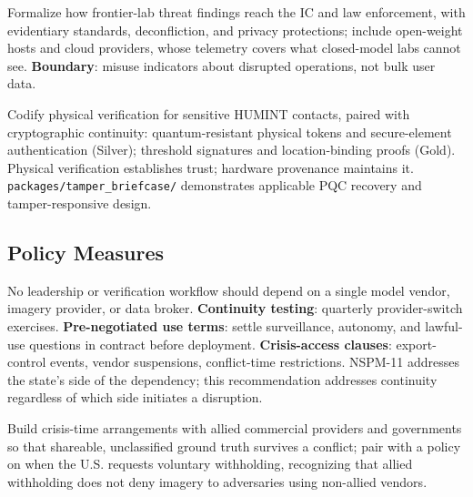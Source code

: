 \documentclass[11pt,letterpaper]{article}
\begin{document}
\begin{recbox}
Formalize how frontier-lab threat findings reach the IC and law enforcement, with evidentiary standards, deconfliction, and privacy protections; include open-weight hosts and cloud providers, whose telemetry covers what closed-model labs cannot see. \textbf{Boundary}: misuse indicators about disrupted operations, not bulk user data.
\end{recbox}

\begin{recbox}
Codify physical verification for sensitive HUMINT contacts, paired with cryptographic continuity: quantum-resistant physical tokens and secure-element authentication (Silver); threshold signatures and location-binding proofs (Gold). Physical verification establishes trust; hardware provenance maintains it. \texttt{packages/tamper\_briefcase/} demonstrates applicable PQC recovery and tamper-responsive design.
\end{recbox}

\subsection{Policy Measures}

\begin{recbox}
No leadership or verification workflow should depend on a single model vendor, imagery provider, or data broker. \textbf{Continuity testing}: quarterly provider-switch exercises. \textbf{Pre-negotiated use terms}: settle surveillance, autonomy, and lawful-use questions in contract before deployment. \textbf{Crisis-access clauses}: export-control events, vendor suspensions, conflict-time restrictions. NSPM-11 addresses the state's side of the dependency; this recommendation addresses continuity regardless of which side initiates a disruption.
\end{recbox}

\begin{recbox}
Build crisis-time arrangements with allied commercial providers and governments so that shareable, unclassified ground truth survives a conflict; pair with a policy on when the U.S. requests voluntary withholding, recognizing that allied withholding does not deny imagery to adversaries using non-allied vendors.
\end{recbox}
\end{document}
